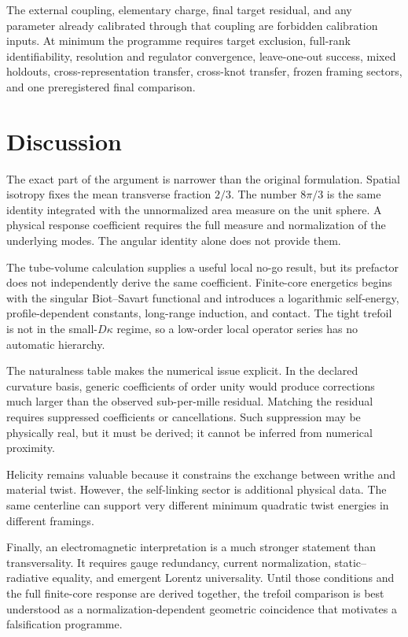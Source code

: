 \documentclass[aps,pre,preprint,notitlepage,nofootinbib,superscriptaddress]{revtex4-2}
\begin{document}
The external coupling, elementary charge, final target residual, and any parameter already calibrated through that coupling are forbidden calibration inputs.  At minimum the programme requires target exclusion, full-rank identifiability, resolution and regulator convergence, leave-one-out success, mixed holdouts, cross-representation transfer, cross-knot transfer, frozen framing sectors, and one preregistered final comparison.

\section{Discussion}
\label{sec:discussion}

The exact part of the argument is narrower than the original formulation.  Spatial isotropy fixes the mean transverse fraction $2/3$.  The number $8\pi/3$ is the same identity integrated with the unnormalized area measure on the unit sphere.  A physical response coefficient requires the full measure and normalization of the underlying modes.  The angular identity alone does not provide them.

The tube-volume calculation supplies a useful local no-go result, but its prefactor does not independently derive the same coefficient.  Finite-core energetics begins with the singular Biot--Savart functional and introduces a logarithmic self-energy, profile-dependent constants, long-range induction, and contact.  The tight trefoil is not in the small-$D\kappa$ regime, so a low-order local operator series has no automatic hierarchy.

The naturalness table makes the numerical issue explicit.  In the declared curvature basis, generic coefficients of order unity would produce corrections much larger than the observed sub-per-mille residual.  Matching the residual requires suppressed coefficients or cancellations.  Such suppression may be physically real, but it must be derived; it cannot be inferred from numerical proximity.

Helicity remains valuable because it constrains the exchange between writhe and material twist.  However, the self-linking sector is additional physical data.  The same centerline can support very different minimum quadratic twist energies in different framings.

Finally, an electromagnetic interpretation is a much stronger statement than transversality.  It requires gauge redundancy, current normalization, static--radiative equality, and emergent Lorentz universality.  Until those conditions and the full finite-core response are derived together, the trefoil comparison is best understood as a normalization-dependent geometric coincidence that motivates a falsification programme.
\end{document}

